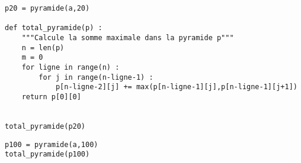 




\begin{lstlisting}
p20 = pyramide(a,20)

def total_pyramide(p) :
    """Calcule la somme maximale dans la pyramide p"""
    n = len(p)
    m = 0
    for ligne in range(n) :
        for j in range(n-ligne-1) :
            p[n-ligne-2][j] += max(p[n-ligne-1][j],p[n-ligne-1][j+1])
    return p[0][0]
    
    
total_pyramide(p20)

\end{lstlisting}

\medskip




\begin{lstlisting}
p100 = pyramide(a,100)
total_pyramide(p100)

\end{lstlisting}